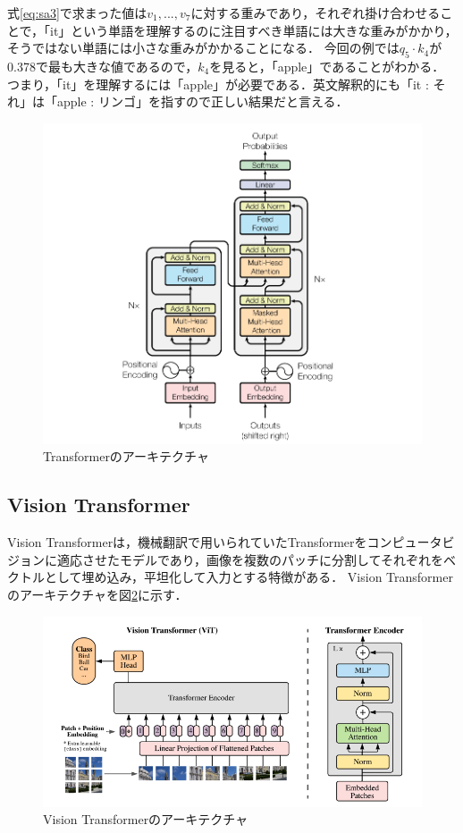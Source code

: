 \documentclass[a4paper, oneside, openany, dvipdfmx]{suribt}%
\newcommand{\fref}[1]{図\ref{#1}}
\newcommand{\eref}[1]{式\eqref{#1}}
\begin{document}
\eref{eq:sa3}で求まった値は$v_{1},...,v_{7}$に対する重みであり，それぞれ掛け合わせることで，「it」という単語を理解するのに注目すべき単語には大きな重みがかかり，そうではない単語には小さな重みがかかることになる．
今回の例では$q_{5}\cdot k_{4}$が0.378で最も大きな値であるので，$k_{4}$を見ると，「apple」であることがわかる．
つまり，「it」を理解するには「apple」が必要である．英文解釈的にも「it : それ」は「apple : リンゴ」を指すので正しい結果だと言える．

\begin{figure}[H]
  \centering
  \includegraphics[width=0.9\linewidth]{figs/transformer.png}
  \caption{Transformerのアーキテクチャ\cite{vaswani2017attention}}
  \label{fig:tr_arch}
\end{figure}
\subsection{Vision Transformer}
Vision Transformerは，機械翻訳で用いられていたTransformerをコンピュータビジョンに適応させたモデルであり，画像を複数のパッチに分割してそれぞれをベクトルとして埋め込み，平坦化して入力とする特徴がある\cite{dosovitskiy2021image}．
Vision Transformerのアーキテクチャを\fref{fig:vit_arch}に示す．
\begin{figure}[H]
  \centering
  \includegraphics[width=0.9\linewidth]{figs/vit.png}
  \caption{Vision Transformerのアーキテクチャ\cite{dosovitskiy2021image}}
  \label{fig:vit_arch}
\end{figure}
\end{document}

